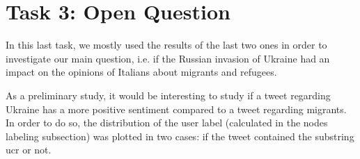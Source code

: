 \documentclass[sigchi]{acmart}
\begin{document}
\section{Task 3: Open Question}

In this last task, we mostly used the results of the last two ones in order to investigate our main question, i.e. if the Russian invasion of Ukraine had an impact on the opinions of Italians about migrants and refugees.

As a preliminary study, it would be interesting to study if a tweet regarding Ukraine has a more positive sentiment compared to a tweet regarding migrants. In order to do so, the distribution of the user label (calculated in the nodes labeling subsection) was plotted in two cases: if the tweet contained the substring ucr or not. 
\end{document}
